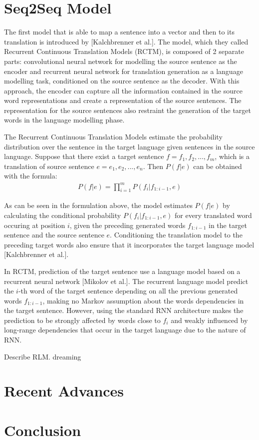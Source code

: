 \documentclass[12pt]{extarticle}
\begin{document}
\section*{Seq2Seq Model}
The first model that is able to map a sentence into a vector and then to its translation is introduced by [Kalchbrenner et al.]. The model, which they called Recurrent Continuous Translation Models (RCTM), is composed of 2 separate parts: convolutional neural network for modelling the source sentence as the encoder and recurrent neural network for translation generation as a language modelling task, conditioned on the source sentence as the decoder. With this approach, the encoder can capture all the information contained in the source word representations and create a representation of the source sentences. The representation for the source sentences also restraint the generation of the target words in the language modelling phase.

The Recurrent Continuous Translation Models estimate the probability distribution over the sentence in the target language given sentences in the source language. Suppose that there exist a target sentence $f = f_{1},f_{2},...,f_{m}$, which is a translation of source sentence $e = e_{1}, e_{2},...,e_{n}$. Then $P(f|e)$ can be obtained with the formula:
\begin{align*}
P(f|e) = \prod_{i=1}^{m} P(f_{i}|f_{1:i-1}, e)
\end{align*}

As can be seen in the formulation above, the model estimates $P(f|e)$ by calculating the conditional probability $P(f_{i}|f_{1:i-1}, e)$ for every translated word occuring at position $i$, given the preceding generated words $f_{1:i-1}$ in the target sentence and the source sentence $e$. Conditioning the translation model to the preceding target words also ensure that it incorporates the target language model [Kalchbrenner et al.].

In RCTM, prediction of the target sentence use a language model based on a recurrent neural network [Mikolov et al.]. The recurrent language model predict the $i$-th word of the target sentence depending on all the previous generated words $f_{1:i-1}$, making no Markov assumption about the words dependencies in the target sentence. However, using the standard RNN architecture makes the prediction to be strongly affected by words close to $f_{i}$ and weakly influenced by long-range dependencies that occur in the target language due to the nature of RNN.

Describe RLM. dreaming

\section*{Recent Advances} %

\section*{Conclusion}
\end{document}
